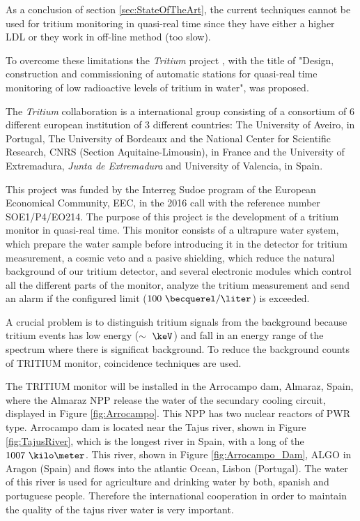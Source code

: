 As a conclusion of section \ref{sec:StateOfTheArt}, the current techniques cannot be used for tritium monitoring in quasi-real time since they have either a higher LDL or they work in off-line method (too slow). 

To overcome these limitations the \textit{Tritium} project \cite{TRITIUM}, with the title of "Design, construction and commissioning of automatic stations for quasi-real time monitoring of low radioactive levels of tritium in water", was proposed.

The \textit{Tritium} collaboration is a international group consisting of a consortium of 6 different european institution of 3 different countries: The University of Aveiro, in Portugal, The University of Bordeaux and the National Center for Scientific Research, CNRS  (Section Aquitaine-Limousin), in France and the University of Extremadura, \textit{Junta de Extremadura} and University of Valencia, in Spain.

This project was funded by the Interreg Sudoe program of the European Economical Community, EEC, in the 2016 call with the reference number SOE1/P4/EO214. The purpose of this project is the development of a tritium monitor in quasi-real time. This monitor consists of a ultrapure water system, which prepare the water sample before introducing it in the detector for tritium measurement, a cosmic veto and a pasive shielding, which reduce the natural background of our tritium detector, and several electronic modules which control all the different parts of the monitor, analyze the tritium measurement and send an alarm if the configured limit ($100~\becquerel/\liter$) is exceeded.

A crucial problem is to distinguish tritium signals from the background because tritium events has low energy ($\sim~\keV$) and fall in an energy range of the spectrum where there is significat background. To reduce the background counts of TRITIUM monitor, coincidence techniques are used.


The TRITIUM monitor will be installed in the Arrocampo dam, Almaraz, Spain, where the Almaraz NPP release the water of the secundary cooling circuit, displayed in Figure \ref{fig:Arrocampo}. This NPP has two nuclear reactors of PWR type. Arrocampo dam is located near the Tajus river, shown in Figure \ref{fig:TajusRiver}, which is the longest river in Spain, with a long of the $1007~\kilo\meter$. This river, shown in Figure \ref{fig:Arrocampo_Dam}, ALGO in Aragon (Spain) and flows into the atlantic Ocean, Lisbon (Portugal). The water of this river is used for agriculture and drinking water by both, spanish and portuguese people. Therefore the international cooperation in order to maintain the quality of the tajus river water is very important.

